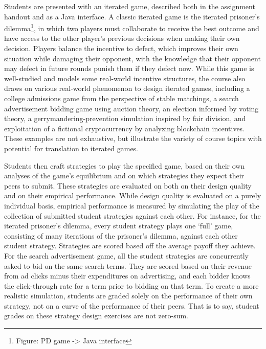 \documentclass[pageno]{jpaper}
\begin{document}
Students are presented with an iterated game, described both in the assignment handout and as a Java interface.
A classic iterated game is the iterated prisoner's dilemma\footnote{Figure: PD game -> Java interface}, in which two players must collaborate to receive the best outcome and have access to the other player's previous decisions when making their own decision.
Players balance the incentive to defect, which improves their own situation while damaging their opponent, with the knowledge that their opponent may defect in future rounds punish them if they defect now.
While this game is well-studied and models some real-world incentive structures, the course also draws on various real-world phenomenon to design iterated games, including a college admissions game from the perspective of stable matchings, a search advertisement bidding game using auction theory, an election informed by voting theory, a gerrymandering-prevention simulation inspired by fair division, and exploitation of a fictional cryptocurrency by analyzing blockchain incentives.
These examples are not exhaustive, but illustrate the variety of course topics with potential for translation to iterated games.

Students then craft strategies to play the specified game, based on their own analyses of the game's equilibrium and on which strategies they expect their peers to submit.
These strategies are evaluated on both on their design quality and on their empirical performance.
While design quality is evaluated on a purely individual basis, empirical performance is measured by simulating the play of the collection of submitted student strategies against each other.
For instance, for the iterated prisoner's dilemma, every student strategy plays one `full' game, consisting of many iterations of the prisoner's dilemma, against each other student strategy.
Strategies are scored based off the average payoff they achieve.
For the search advertisement game, all the student strategies are concurrently asked to bid on the same search terms.
They are scored based on their revenue from ad clicks minus their expenditures on advertising, and each bidder knows the click-through rate for a term prior to bidding on that term.
To create a more realistic simulation, students are graded solely on the performance of their own strategy, not on a curve of the performance of their peers.
That is to say, student grades on these strategy design exercises are not zero-sum.
\end{document}
